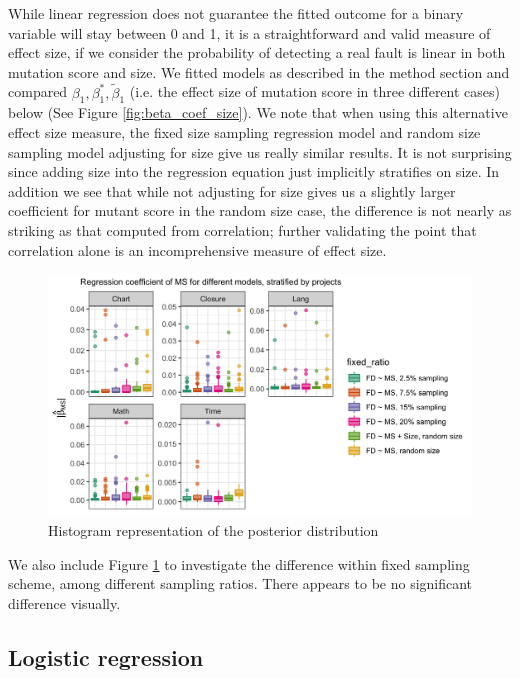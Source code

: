 \documentclass[10pt,letterpaper]{article}
\begin{document}
While linear regression does not guarantee the fitted outcome for a binary variable will stay between 0 and 1, it is a straightforward and valid measure of effect size, if we consider the probability of detecting a real fault is linear in both mutation score and size. We fitted models as described in the method section and compared $\beta_1,\beta^*_1,\tilde{\beta}_1$ (i.e. the effect size of mutation score in three different cases) below (See Figure \ref{fig:beta_coef_size}). We note that when using this alternative effect size measure, the fixed size sampling regression model and random size sampling model adjusting for size give us really similar results. It is not surprising since adding size into the regression equation just implicitly stratifies on size. In addition we see that while not adjusting for size gives us a slightly larger coefficient for mutant score in the random size case, the difference is not nearly as striking as that computed from correlation; further validating the point that correlation alone is an incomprehensive measure of effect size. 

      \begin{figure}[ht!]
        \centering
        \includegraphics[scale=0.15]{figures/stratified_beta_coef_size.png}
        \caption{Histogram representation of the posterior distribution}
        \label{fig:stratified_beta_coef_size}
    \end{figure}



We also include Figure \ref{fig:stratified_beta_coef_size} to investigate the difference within fixed sampling scheme, among different sampling ratios. There appears to be no significant difference visually.


\subsection{Logistic regression}
\end{document}
